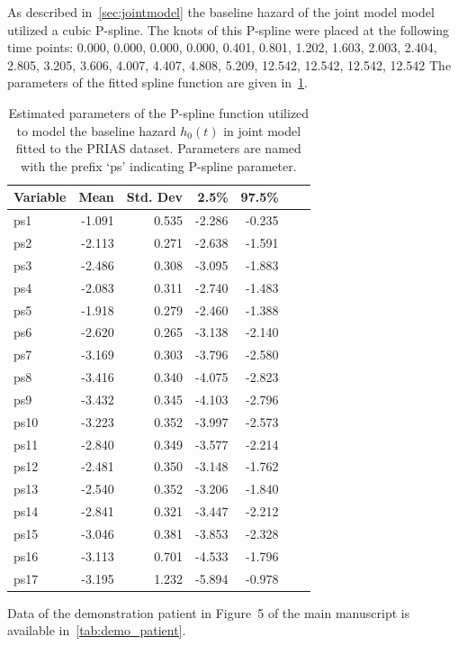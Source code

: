 As described in~\ref{sec:jointmodel} the baseline hazard of the joint model model utilized a cubic P-spline. The knots of this P-spline were placed at the following time points:
0.000, 0.000, 0.000, 0.000, 0.401, 0.801, 1.202, 1.603, 2.003, 2.404, 2.805, 3.205, 3.606, 4.007, 4.407, 4.808, 5.209, 12.542, 12.542, 12.542, 12.542
The parameters of the fitted spline function are given in~\ref{tab:baseline_hazard}.
\begin{table}[!htb]
\begin{center}
\caption{Estimated parameters of the P-spline function utilized to model the baseline hazard $h_0(t)$ in joint model fitted to the PRIAS dataset. Parameters are named with the prefix `ps' indicating P-spline parameter.}
\label{tab:baseline_hazard}
\begin{tabular}{lrrrrrr}
\hline
\hline
Variable                         & Mean & Std. Dev & 2.5\%  & 97.5\%   \\
\hline
ps1  & -1.091 & 0.535 & -2.286 & -0.235 \\
ps2  & -2.113 & 0.271 & -2.638 & -1.591 \\
ps3  & -2.486 & 0.308 & -3.095 & -1.883 \\
ps4  & -2.083 & 0.311 & -2.740 & -1.483 \\
ps5  & -1.918 & 0.279 & -2.460 & -1.388 \\
ps6  & -2.620 & 0.265 & -3.138 & -2.140 \\
ps7  & -3.169 & 0.303 & -3.796 & -2.580 \\
ps8  & -3.416 & 0.340 & -4.075 & -2.823 \\
ps9  & -3.432 & 0.345 & -4.103 & -2.796 \\
ps10 & -3.223 & 0.352 & -3.997 & -2.573 \\
ps11 & -2.840 & 0.349 & -3.577 & -2.214 \\
ps12 & -2.481 & 0.350 & -3.148 & -1.762 \\
ps13 & -2.540 & 0.352 & -3.206 & -1.840 \\
ps14 & -2.841 & 0.321 & -3.447 & -2.212 \\
ps15 & -3.046 & 0.381 & -3.853 & -2.328 \\
ps16 & -3.113 & 0.701 & -4.533 & -1.796 \\
ps17 & -3.195 & 1.232 & -5.894 & -0.978 \\
\hline
\end{tabular}
\end{center}
\end{table}

Data of the demonstration patient in Figure~5 of the main manuscript is available in~\ref{tab:demo_patient}.

